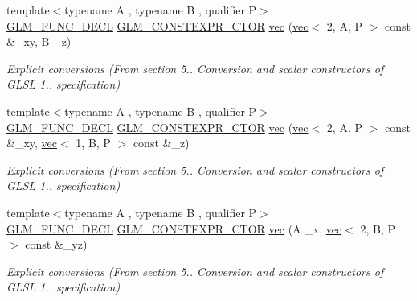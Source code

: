 \begin{DoxyCompactItemize}
\item 
{\footnotesize template$<$typename A , typename B , qualifier P$>$ }\\\mbox{\hyperlink{setup_8hpp_ab2d052de21a70539923e9bcbf6e83a51}{G\+L\+M\+\_\+\+F\+U\+N\+C\+\_\+\+D\+E\+CL}} \mbox{\hyperlink{setup_8hpp_ad34178a09666081abdb573c14d1f4a5a}{G\+L\+M\+\_\+\+C\+O\+N\+S\+T\+E\+X\+P\+R\+\_\+\+C\+T\+OR}} \mbox{\hyperlink{structglm_1_1vec_3_013_00_01_t_00_01_q_01_4_a7c657ca44f6029476baa5ad38c8e6220}{vec}} (\mbox{\hyperlink{structglm_1_1vec}{vec}}$<$ 2, A, P $>$ const \&\+\_\+xy, B \+\_\+z)
\begin{DoxyCompactList}\small\item\em Explicit conversions (From section 5.. Conversion and scalar constructors of G\+L\+SL 1.. specification) \end{DoxyCompactList}\item 
{\footnotesize template$<$typename A , typename B , qualifier P$>$ }\\\mbox{\hyperlink{setup_8hpp_ab2d052de21a70539923e9bcbf6e83a51}{G\+L\+M\+\_\+\+F\+U\+N\+C\+\_\+\+D\+E\+CL}} \mbox{\hyperlink{setup_8hpp_ad34178a09666081abdb573c14d1f4a5a}{G\+L\+M\+\_\+\+C\+O\+N\+S\+T\+E\+X\+P\+R\+\_\+\+C\+T\+OR}} \mbox{\hyperlink{structglm_1_1vec_3_013_00_01_t_00_01_q_01_4_a800af9ada84dfb76714e279e81eb266e}{vec}} (\mbox{\hyperlink{structglm_1_1vec}{vec}}$<$ 2, A, P $>$ const \&\+\_\+xy, \mbox{\hyperlink{structglm_1_1vec}{vec}}$<$ 1, B, P $>$ const \&\+\_\+z)
\begin{DoxyCompactList}\small\item\em Explicit conversions (From section 5.. Conversion and scalar constructors of G\+L\+SL 1.. specification) \end{DoxyCompactList}\item 
{\footnotesize template$<$typename A , typename B , qualifier P$>$ }\\\mbox{\hyperlink{setup_8hpp_ab2d052de21a70539923e9bcbf6e83a51}{G\+L\+M\+\_\+\+F\+U\+N\+C\+\_\+\+D\+E\+CL}} \mbox{\hyperlink{setup_8hpp_ad34178a09666081abdb573c14d1f4a5a}{G\+L\+M\+\_\+\+C\+O\+N\+S\+T\+E\+X\+P\+R\+\_\+\+C\+T\+OR}} \mbox{\hyperlink{structglm_1_1vec_3_013_00_01_t_00_01_q_01_4_a06a314f757e08eddfb46a1c759cf5c8e}{vec}} (A \+\_\+x, \mbox{\hyperlink{structglm_1_1vec}{vec}}$<$ 2, B, P $>$ const \&\+\_\+yz)
\begin{DoxyCompactList}\small\item\em Explicit conversions (From section 5.. Conversion and scalar constructors of G\+L\+SL 1.. specification) \end{DoxyCompactList}\item 

\end{DoxyCompactItemize}
